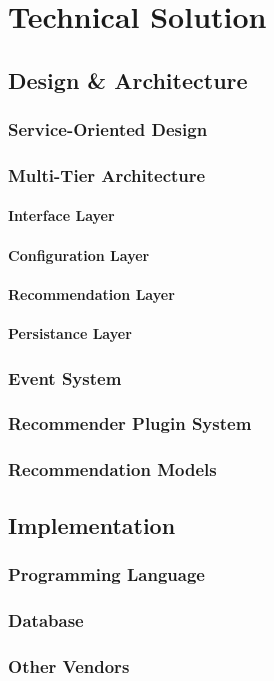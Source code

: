 \chapter{Technical Solution}


\section{Design \& Architecture}

\subsection{Service-Oriented Design}

\subsection{Multi-Tier Architecture}

\subsubsection{Interface Layer}
\subsubsection{Configuration Layer}
\subsubsection{Recommendation Layer}
\subsubsection{Persistance Layer}

\subsection{Event System}

\subsection{Recommender Plugin System}

\subsection{Recommendation Models}


\section{Implementation}

\subsection{Programming Language}
\subsection{Database}
\subsection{Other Vendors}